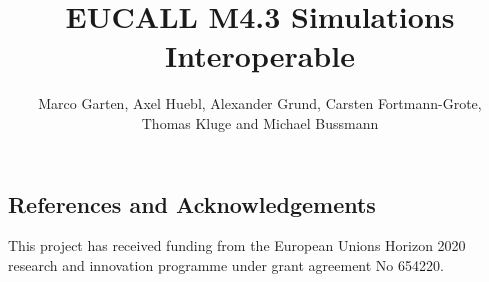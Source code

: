 \documentclass[a4paper]{article}
\title{EUCALL M4.3 Simulations Interoperable}
\author {Marco Garten, Axel Huebl, Alexander Grund, Carsten Fortmann-Grote, \\Thomas Kluge and Michael Bussmann}
\begin{document}
\maketitle


\FloatBarrier
\subsection{References and Acknowledgements}

This project has received funding from the European Unions Horizon 2020 research and innovation programme under grant agreement No 654220.



\end{document}
